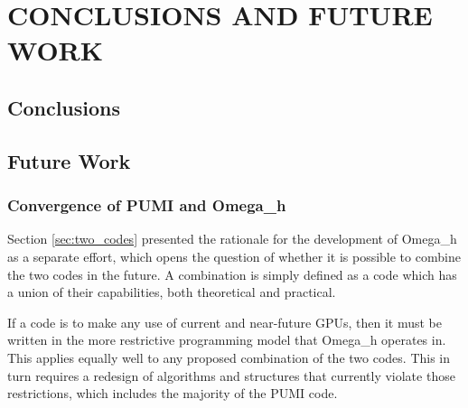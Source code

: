 
\chapter{CONCLUSIONS AND FUTURE WORK}

\section{Conclusions}

\section{Future Work}

\subsection{Convergence of PUMI and Omega\_h}

Section \ref{sec:two_codes} presented the rationale
for the development of Omega\_h as a separate effort,
which opens the question of whether it is possible
to combine the two codes in the future.
A combination is simply defined as a code which
has a union of their capabilities, both theoretical
and practical.

If a code is to make any use of current and near-future GPUs,
then it must be written in the more restrictive programming
model that Omega\_h operates in.
This applies equally well to any proposed combination of the
two codes.
This in turn requires a redesign of algorithms
and structures that currently violate those restrictions,
which includes the majority of the PUMI code.
